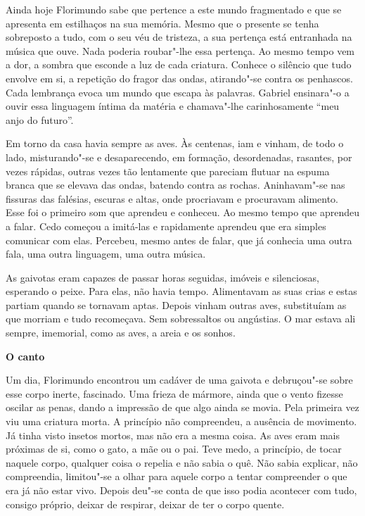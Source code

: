 Ainda hoje Florimundo sabe que pertence a este mundo fragmentado e que
se apresenta em estilhaços na sua memória. Mesmo que o presente se tenha
sobreposto a tudo, com o seu véu de tristeza, a sua pertença está
entranhada na música que ouve. Nada poderia roubar"-lhe essa pertença. Ao
mesmo tempo vem a dor, a sombra que esconde a luz de cada criatura.
Conhece o silêncio que tudo envolve em si, a repetição do fragor das
ondas, atirando"-se contra os penhascos. Cada lembrança evoca um mundo
que escapa às palavras. Gabriel ensinara"-o a ouvir essa linguagem íntima
da matéria e chamava"-lhe carinhosamente ``meu anjo do futuro''.

Em torno da casa havia sempre as aves. Às centenas, iam e vinham, de
todo o lado, misturando"-se e desaparecendo, em formação, desordenadas,
rasantes, por vezes rápidas, outras vezes tão lentamente que pareciam
flutuar na espuma branca que se elevava das ondas, batendo contra as
rochas. Aninhavam"-se nas fissuras das falésias, escuras e altas, onde
procriavam e procuravam alimento. Esse foi o primeiro som que aprendeu e
conheceu. Ao mesmo tempo que aprendeu a falar. Cedo começou a imitá-las
e rapidamente aprendeu que era simples comunicar com elas. Percebeu,
mesmo antes de falar, que já conhecia uma outra fala, uma outra
linguagem, uma outra música.

As gaivotas eram capazes de passar horas seguidas, imóveis e
silenciosas, esperando o peixe. Para elas, não havia tempo. Alimentavam
as suas crias e estas partiam quando se tornavam aptas. Depois vinham
outras aves, substituíam as que morriam e tudo recomeçava. Sem
sobressaltos ou\enlargethispage{\textheight} angústias. O mar estava ali sempre, imemorial, como as
aves, a areia e os sonhos.

\pagebreak

\vspace*{1.8cm}
\noindent{}\textbf{O canto}

\bigskip

Um dia, Florimundo encontrou um cadáver de uma gaivota e debruçou"-se
sobre esse corpo inerte, fascinado. Uma frieza de mármore, ainda que o
vento fizesse oscilar as penas, dando a impressão de que algo ainda se
movia. Pela primeira vez viu uma criatura morta. A princípio não
compreendeu, a ausência de movimento. Já tinha visto insetos mortos,
mas não era a mesma coisa. As aves eram mais próximas de si, como o
gato, a mãe ou o pai. Teve medo, a princípio, de tocar naquele corpo,
qualquer coisa o repelia e não sabia o quê. Não sabia explicar, não
compreendia, limitou"-se a olhar para aquele corpo a tentar compreender o
que era já não estar vivo. Depois deu"-se conta de que isso podia
acontecer com tudo, consigo próprio, deixar de respirar, deixar de ter o
corpo quente.

